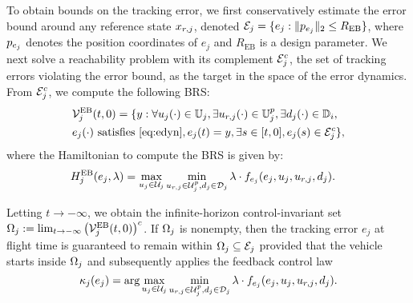 To obtain bounds on the tracking error, we first conservatively estimate the error bound around any reference state $x_{r,j}$, denoted $\mathcal{E}_j = \{e_j: \|p_{e_j}\|_2 \le R_{\text{EB}}\}$,
\noindent where $p_{e_j}$ denotes the position coordinates of $e_j$ and $R_{\text{EB}}$ is a design parameter. We next solve a reachability problem with its complement $\mathcal{E}_j^c$, the set of tracking errors violating the error bound, as the target in the space of the error dynamics. From $\mathcal{E}_j^c$, we compute the following BRS:
\begin{equation} \label{eqn:errBound}
\begin{aligned}
&\mathcal{V}^{\text{EB}}_{j}(t, 0) = \{y: \forall u_j(\cdot) \in \mathbb{U}_j, \exists u_{r, j}(\cdot) \in \mathbb{U}^p_j, \exists d_j(\cdot) \in \mathbb{D}_i, \\
& e_j(\cdot) \text{ satisfies \eqref{eq:edyn}}, e_j(t) = y, \exists s \in [t, 0], e_j(s) \in \mathcal{E}_j^c\}, 
\end{aligned}
\end{equation}
where the Hamiltonian to compute the BRS is given by:
\begin{equation}
\begin{aligned}
H^{\text{EB}}_{j}(e_j, \lambda) &= \max_{u_j \in \mathcal{U}_j} \min_{u_{r, j} \in \mathcal{U}^p_j, d_j \in \mathcal{D}_j} \lambda \cdot f_{e_j}(e_j, u_j, u_{r,j}, d_j).
\end{aligned}
\end{equation}

Letting $t \to -\infty$, we obtain the infinite-horizon control-invariant set $\Omega_j := \lim_{t \to -\infty} \left( \mathcal{V}^{\text{EB}}_{j}(t, 0) \right)^c$. If $\Omega_j$ is nonempty, then the tracking error $e_j$ at flight time is guaranteed to remain within $\Omega_j \subseteq \mathcal{E}_j$ provided that the vehicle starts inside $\Omega_j$ and subsequently applies the feedback control law
\begin{equation}
\label{eq:robust_tracking_law}
\kappa_j(e_j) = \arg\max_{u_j \in \mathcal{U}_j} \min_{u_{r, j} \in\mathcal{U}^p_j, d_j \in \mathcal{D}_j} \lambda \cdot f_{e_j}(e_j,u_j,u_{r, j},d_j).
\end{equation}

